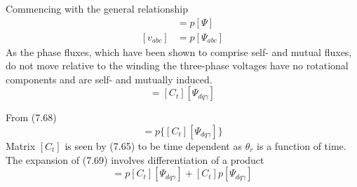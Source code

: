 \documentclass[a4paper,numbers=noenddot,12pt]{scrbook}
\begin{document}
    Commencing with the general relationship
    \begin{align}
        [v] & = p[\varPsi] \nonumber \\
        [v_{abc}] & = p [\varPsi_{abc}]
        \label{eq:Eq7.68}
    \end{align}
    As the phase fluxes, which have been shown to comprise self- and mutual fluxes, do not move relative to the winding the three-phase voltages have no rotational components and are self- and mutually induced.
    \begin{equation*}
        [\varPsi_{abc}] = [C_t] [\varPsi_{dq\gamma}]
    \end{equation*}

    From (7.68)
    \begin{equation}
        [v_{abc}] = p\{[C_t] [\varPsi_{dq\gamma}]\}
        \label{eq:Eq7.69}
    \end{equation}
    Matrix $[C_t]$ is seen by (7.65) to be time dependent as $\theta_r$ is a function of time. The expansion of (7.69) involves differentiation of a product
    \begin{equation*}
        [v_{abc}] = {p[C_t]}[\varPsi_{d q \gamma}] + [C_t]{p[\varPsi_{dq\gamma}]}
    \end{equation*}
\end{document}
